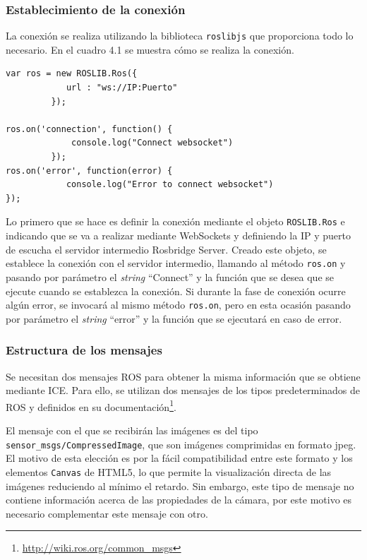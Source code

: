 \subsubsection{Establecimiento de la conexión}

La conexión se realiza utilizando la biblioteca \texttt{roslibjs} que proporciona todo lo necesario. En el cuadro 4.1 se muestra cómo se realiza la conexión.

\begin{lstlisting}[caption= Establecimiento de la conexión ROS, label=cod.conexioncamviz]
var ros = new ROSLIB.Ros({
            url : "ws://IP:Puerto"
         });

ros.on('connection', function() {
             console.log("Connect websocket")
         });
ros.on('error', function(error) {
            console.log("Error to connect websocket")
});
\end{lstlisting}

Lo primero que se hace es definir la conexión mediante el objeto \texttt{ROSLIB.Ros} e indicando que se va a realizar mediante WebSockets y definiendo la IP y puerto de escucha el servidor intermedio Rosbridge Server. Creado este objeto, se establece la conexión con el servidor intermedio, llamando al método \texttt{ros.on} y pasando por parámetro el \textit{string} ``Connect'' y la función que se desea que se ejecute cuando se establezca la conexión. Si durante la fase de conexión ocurre algún error, se invocará al mismo método \texttt{ros.on}, pero en esta ocasión pasando por parámetro el \textit{string} ``error'' y la función que se ejecutará en caso de error.

\subsubsection{Estructura de los mensajes}
Se necesitan dos mensajes ROS para obtener la misma información que se obtiene mediante ICE. Para ello, se utilizan dos mensajes de los tipos predeterminados de ROS y definidos en su documentación\footnote{\url{http://wiki.ros.org/common_msgs}}.

El mensaje con el que se recibirán las imágenes es del tipo \texttt{sensor\_msgs/CompressedImage}, que son imágenes comprimidas en formato jpeg. El motivo de esta elección es por la fácil compatibilidad entre este formato y los elementos \texttt{Canvas} de HTML5, lo que permite la visualización directa de las imágenes reduciendo al mínimo el retardo. Sin embargo, este tipo de mensaje no contiene información acerca de las propiedades de la cámara, por este motivo es necesario complementar este mensaje con otro.

